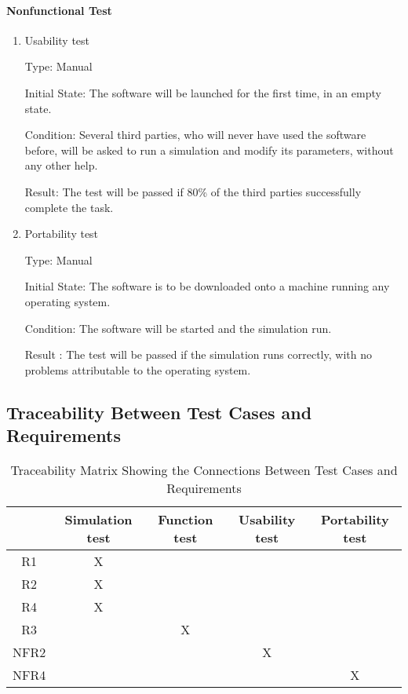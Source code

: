 \documentclass[12pt, titlepage]{article}
\begin{document}
\paragraph{Nonfunctional Test}

\begin{enumerate}

\item{Usability test\\}

Type: Manual
					
Initial State: The software will be launched for the first time, in an empty state.
					
Condition: Several third parties, who will never have used the software before, will be asked to run a simulation and modify its parameters, without any other help.
					
Result: The test will be passed if 80\% of the third parties successfully complete the task.
					
\item{Portability test\\}

Type: Manual
					
Initial State: The software is to be downloaded onto a machine running any operating system.
					
Condition: The software will be started and the simulation run.
					
Result : The test will be passed if the simulation runs correctly, with no problems attributable to the operating system. 
					

\end{enumerate}


\subsection{Traceability Between Test Cases and Requirements}

\begin{table}[h!]
  \centering
  \begin{tabular}{|c|c|c|c|c|}
  \hline        
    & Simulation test & Function test & Usability test &  Portability test\\
  \hline
  R1   & X &   &   & \\ \hline
  R2   & X &   &   &\\ \hline
  R4   & X &   &   & \\ \hline
  R3   &   & X &   & \\ \hline
  NFR2 &   &   & X & \\ \hline
  NFR4 &   &   &   & X\\

  \hline
  \end{tabular}
  \caption{Traceability Matrix Showing the Connections Between Test Cases and Requirements}
  \label{Table:trace}
  \end{table}
\end{document}
